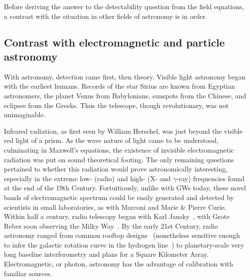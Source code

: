 Before deriving the answer to the detectability question from the field equations, a contrast with the situation in other fields of astronomy is in order.

 
        \subsection{Contrast with electromagnetic and particle astronomy}
        \label{contrast_astro}

        With astronomy, detection came first, then theory.
Visible light astronomy began with the earliest humans.
Records of the star Sirius are known from Egyptian astronomers, the planet Venus from Babylonians, sunspots from the Chinese, and eclipses from the Greeks. 
Thus the telescope, though revolutionary, was not unimaginable.

Infrared radiation, as first seen by William Herschel, was just beyond the visible red light of a prism.
As the wave nature of light came to be understood, culminating in Maxwell's equations, the existence of invisible electromagnetic radiation was put on sound theoretical footing.
The only remaining questions pertained to whether this radiation would prove astronomically interesting, especially in the extreme low- (radio) and high- (X- and $\gamma$-ray) frequencies found at the end of the 19th Century.
Fortuitiously, unlike with GWs today, these novel bands of electromagnetic spectrum could be easily generated and detected by scientists in small laboratories, as with Marconi and Marie \& Pierre Curie.
Within half a century, radio telescopy began with Karl Jansky~\cite{Shklovsky1960}, with Grote Reber soon observing the Milky Way~\cite{Gurzadyan1956}.
By the early 21st Century, radio astronomy ranged from common rooftop designs~\cite{SRT} (nonetheless sensitive enough to infer the galactic rotation curve in the hydrogen line~\cite{MeadorsThesis2008}) to planetary-scale very long baseline interferometry and plans for a Square Kilometer Array.
Electromagnetic, or photon, astronomy has the advantage of calibration with familiar sources.



